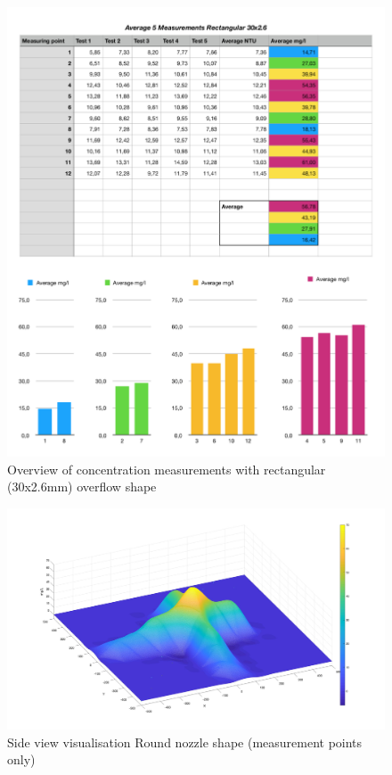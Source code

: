 \begin{figure}[ht]
    \centering
    \includegraphics[width=\linewidth]{Images/Average_Rec30.png}
    \caption{Overview of concentration measurements with rectangular (30x2.6mm) overflow shape}
\end{figure}










\begin{figure}
    \centering
    \includegraphics[width=0.75\linewidth]{Images/Round_side_Mpoint.jpg}
    \caption{Side view visualisation Round nozzle shape (measurement points only)}
\end{figure}

